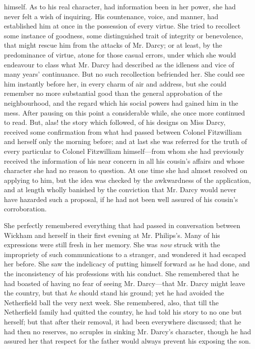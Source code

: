 himself. As to his real character, had information been in her power, she had never felt a wish of inquiring. His countenance, voice, and manner, had established him at once in the possession of every virtue. She tried to recollect some instance of goodness, some distinguished trait of integrity or benevolence, that might rescue him from the attacks of Mr. Darcy; or at least, by the predominance of virtue, atone for those casual errors, under which she would endeavour to class what Mr. Darcy had described as the idleness and vice of many years' continuance. But no such recollection befriended her. She could see him instantly before her, in every charm of air and address, but she could remember no more substantial good than the general approbation of the neighbourhood, and the regard which his social powers had gained him in the mess. After pausing on this point a considerable while, she once more continued to read. But, alas! the story which followed, of his designs on Miss Darcy, received some confirmation from what had passed between Colonel Fitzwilliam and herself only the morning before; and at last she was referred for the truth of every particular to Colonel Fitzwilliam himself---from whom she had previously received the information of his near concern in all his cousin's affairs and whose character she had no reason to question. At one time she had almost resolved on applying to him, but the idea was checked by the awkwardness of the application, and at length wholly banished by the conviction that Mr. Darcy would never have hazarded such a proposal, if he had not been well assured of his cousin's corroboration.

She perfectly remembered everything that had passed in conversation between Wickham and herself in their first evening at Mr. Philips's. Many of his expressions were still fresh in her memory. She was \textit{now} struck with the impropriety of such communications to a stranger, and wondered it had escaped her before. She saw the indelicacy of putting himself forward as he had done, and the inconsistency of his professions with his conduct. She remembered that he had boasted of having no fear of seeing Mr. Darcy---that Mr. Darcy might leave the country, but that \textit{he} should stand his ground; yet he had avoided the Netherfield ball the very next week. She remembered, also, that till the Netherfield family had quitted the country, he had told his story to no one but herself; but that after their removal, it had been everywhere discussed; that he had then no reserves, no scruples in sinking Mr. Darcy's character, though he had assured her that respect for the father would always prevent his exposing the son.

